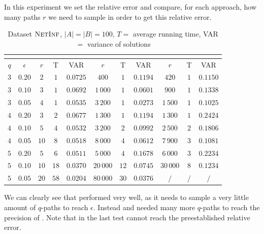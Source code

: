 In this experiment we set the relative error and compare, for each approach, how many paths $r$ we need to sample in order to get this relative error.\medskip

\begin{table}[h]
	\centering
	\begin{tabular}{|c|c|c|c|c|c|c|c|c|c|c|}
		\cline{3-11}
		\multicolumn{2}{c|}{} & \multicolumn{3}{c|}{\fcount} & \multicolumn{3}{c|}{\fsamp} & \multicolumn{3}{c|}{\base}\\
		\hline	
		$q$ & $\epsilon$ & $r$ & T    & VAR      & $r$ & T    & VAR      & $r$ & T   & VAR      \\ \hline
		$3$ & $0.20$     & $2$  & $1$  & $0.0725$ & $400$     & $1$  & $0.1194$ & $420$     & $1$ & $0.1150$ \\ \hline
		$3$ & $0.10$     & $3$  & $1$  & $0.0692$ & $1\,000$  & $1$  & $0.0601$ & $900$     & $1$ & $0.1338$ \\ \hline
		$3$ & $0.05$     & $4$  & $1$  & $0.0535$ & $3\,200$  & $1$  & $0.0273$ & $1\,500$  & $1$ & $0.1025$ \\ \hline
		\hline
		$4$ & $0.20$     & $3$  & $2$  & $0.0677$ & $1\,300$  & $1$  & $0.1194$ & $1\,300$  & $1$ & $0.2424$ \\ \hline
		$4$ & $0.10$     & $5$  & $4$  & $0.0532$ & $3\,200$  & $2$  & $0.0992$ & $2\,500$  & $2$ & $0.1806$ \\ \hline
		$4$ & $0.05$     & $10$ & $8$  & $0.0518$ & $8\,000$  & $4$  & $0.0612$ & $7\,900$  & $3$ & $0.1081$ \\ \hline
		\hline
		$5$ & $0.20$     & $5$  & $6$  & $0.0511$ & $5\,000$  & $4$  & $0.1678$ & $6\,000$  & $3$ & $0.2234$ \\ \hline
		$5$ & $0.10$     & $10$ & $18$ & $0.0370$ & $20\,000$ & $12$ & $0.0745$ & $30\,000$ & $8$ & $0.1234$ \\ \hline
		$5$ & $0.05$     & $20$ & $58$ & $0.0204$ & $80\,000$ & $30$ & $0.0376$ & $/$       & $/$ & $/$      \\ \hline
	\end{tabular}
	\caption{Dataset $\textsc{NetInf}$, $|A| = |B| = 100$, $T = $ average running time, VAR $ = $ variance of solutions}
\end{table}
\medskip

We can clearly see that \fcount performed very well, as it needs to sample a very little amount of $q$-paths to reach $\epsilon$.
Instead \fsamp and \base needed many more $q$-paths to reach the precision of \fcount. Note that in the last test \base cannot reach the preestablished relative error.\bigskip

